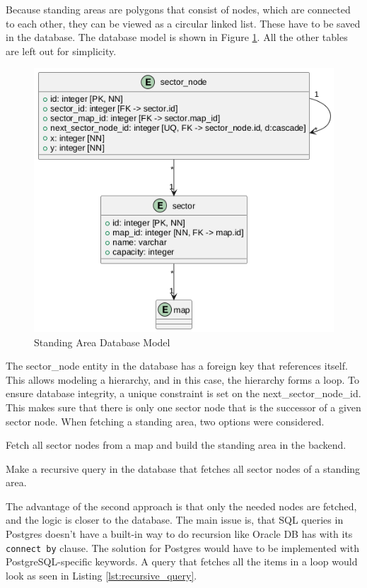 Because standing areas are polygons that consist of nodes, which are connected to each other, they can be viewed as a circular linked list. These have to be saved in the database. The database model is shown in Figure \ref{fig:standing_area_db_model}. All the other tables are left out for simplicity.

\begin{figure}[H]
    \centering
    \includegraphics[scale=0.5]{pics/standing-area-db.png}
    \caption{Standing Area Database Model}
    \label{fig:standing_area_db_model}
\end{figure}

The sector\_node entity in the database has a foreign key that references itself. This allows modeling a hierarchy, and in this case, the hierarchy forms a loop. To ensure database integrity, a unique constraint is set on the next\_sector\_node\_id. This makes sure that there is only one sector node that is the successor of a given sector node. When fetching a standing area, two options were considered.

\begin{compactenum}
\item Fetch all sector nodes from a map and build the standing area in the backend.
\item Make a recursive query in the database that fetches all sector nodes of a standing area.
\end{compactenum}

The advantage of the second approach is that only the needed nodes are fetched, and the logic is closer to the database. The main issue is, that SQL queries in Postgres doesn't have  a built-in way to do recursion like Oracle DB has with its \texttt{connect by} clause. The solution for Postgres would have to be implemented with PostgreSQL-specific keywords. A query that fetches all the items in a loop would look as seen in Listing \ref{lst:recursive_query}. 

